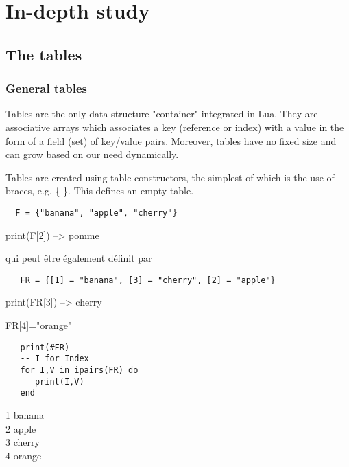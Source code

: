 \newpage

\section{In-depth study} %
\label{sec:in_depth_study}

\subsection{The tables} %
\label{sub:the_tables}

\subsubsection{General tables} %
\label{ssub:general_tables}
Tables are the only data structure "container" integrated in Lua.
 They are associative arrays  which associates a key (reference or index) with a value in the form of a field (set) of key/value pairs. Moreover, tables have no fixed size and can grow based on our need dynamically.

Tables are created using table constructors,  the simplest of which is the use of braces, e.g. \{ \}. This defines an empty table.

\begin{mybox}
\begin{Verbatim}
  F = {"banana", "apple", "cherry"}
\end{Verbatim}
\end{mybox}


print(F[2]) --> pomme


qui peut être également définit par

\begin{mybox}
\begin{Verbatim}
   FR = {[1] = "banana", [3] = "cherry", [2] = "apple"}
\end{Verbatim}
\end{mybox}


print(FR[3]) --> cherry

FR[4]="orange"

\begin{mybox}
\begin{Verbatim}
   print(#FR)
   -- I for Index
   for I,V in ipairs(FR) do
      print(I,V)
   end 
\end{Verbatim}
\end{mybox}

1 banana\\
2 apple\\
3 cherry\\
4 orange\\

